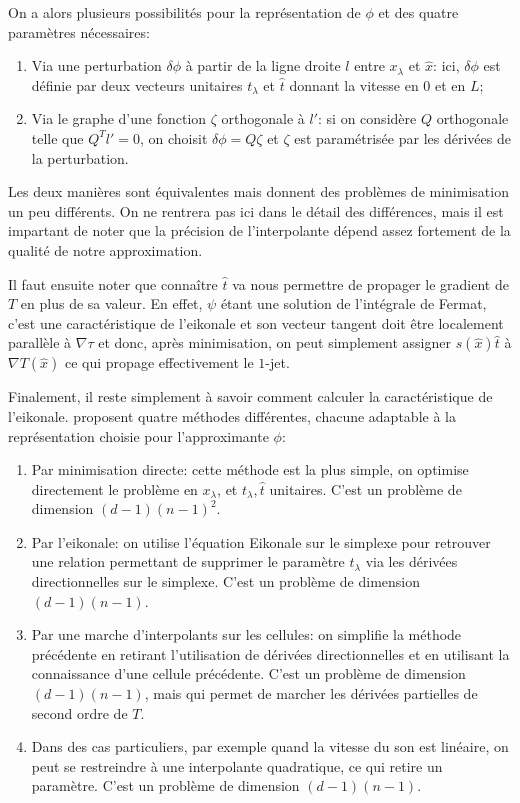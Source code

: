 \documentclass[math, info]{mpb-cours}
\begin{document}
\smallskip

On a alors plusieurs possibilités pour la représentation de $\phi$ et des quatre paramètres nécessaires:
\begin{enumerate}
	\item Via une perturbation $\delta\phi$ à partir de la ligne droite $l$ entre $x_{\lambda}$ et
	      $\hat{x}$: ici, $\delta\phi$ est définie par deux vecteurs unitaires $t_{\lambda}$ et $\hat{t}$
	      donnant la vitesse en $0$ et en $L$;
	\item Via le graphe d'une fonction $\zeta$ orthogonale à $l'$: si on considère $Q$ orthogonale telle que
	      $Q^{T}l' = 0$, on choisit $\delta\phi = Q\zeta$ et $\zeta$ est paramétrisée par les dérivées de la
	      perturbation.
\end{enumerate}
Les deux manières sont équivalentes mais donnent des problèmes de minimisation un peu différents.
On ne rentrera pas ici dans le détail des différences, mais il est impartant de noter que la précision
de l'interpolante dépend assez fortement de la qualité de notre approximation.

\smallskip

Il faut ensuite noter que connaître $\hat{t}$ va nous permettre de propager le gradient de $T$ en plus de
sa valeur.
En effet, $\psi$ étant une solution de l'intégrale de Fermat, c'est une caractéristique de l'eikonale et
son vecteur tangent doit être localement parallèle à $\nabla\tau$ et donc, après minimisation,
on peut simplement assigner $s(\hat{x})\hat{t}$ à $\nabla T(\hat{x})$ ce qui propage effectivement
le $1$-jet.

\smallskip

Finalement, il reste simplement à savoir comment calculer la caractéristique de l'eikonale.
\cite{potter2021jetmarchingmethodssolving} proposent quatre méthodes différentes, chacune adaptable à
la représentation choisie pour l'approximante $\phi$:
\begin{enumerate}
	\item Par minimisation directe: cette méthode est la plus simple, on optimise directement le problème en
	      $x_{\lambda}$, et $t_{\lambda}, \hat{t}$ unitaires. C'est un problème de dimension
	      $(d - 1)(n - 1)^{2}$.
	\item Par l'eikonale: on utilise l'équation Eikonale sur le simplexe pour retrouver une relation
	      permettant de supprimer le paramètre $t_{\lambda}$ via les dérivées directionnelles sur le simplexe.
	      C'est un problème de dimension $(d - 1)(n - 1)$.
	\item Par une marche d'interpolants sur les cellules: on simplifie la méthode précédente en retirant
	      l'utilisation de dérivées directionnelles et en utilisant la connaissance d'une cellule précédente.
	      C'est un problème de dimension $(d - 1)(n - 1)$, mais qui permet de marcher les dérivées
	      partielles de second ordre de $T$.
	\item Dans des cas particuliers, par exemple quand la vitesse du son est linéaire, on peut se
	      restreindre à une interpolante quadratique, ce qui retire un paramètre.
	      C'est un problème de dimension $(d - 1)(n - 1)$.
\end{enumerate}
\end{document}
